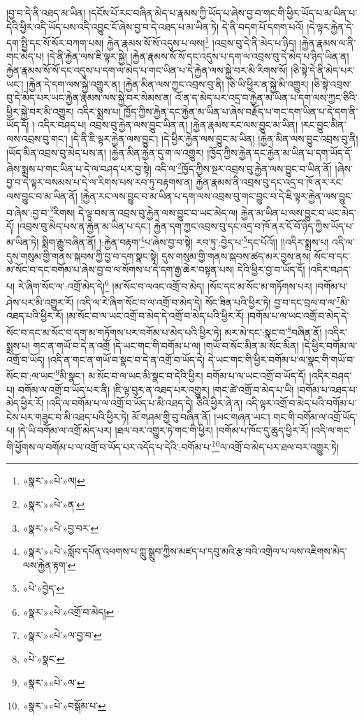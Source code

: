 །བྱ་བ་དེ་ནི་འཐད་མ་ཡིན། །དངོས་པོ་རང་བཞིན་མེད་པ་རྣམས་ཀྱི་ཡོད་པ་ཞེས་བྱ་བ་གང་གི་ཕྱིར་ཡོད་པ་མ་ཡིན་པ་དེའི་ཕྱིར་འདི་ཡོད་པས་འདི་འབྱུང་ངོ་ཞེས་བྱ་བ་དེ་འཐད་པ་མ་ཡིན་ཏེ། དེ་ནི་བདག་པོ་དགག་པའོ། །དེ་ལྟར་རྐྱེན་དེ་དག་སྤྱི་དང་སོ་སོར་བཀག་པས། རྐྱེན་རྣམས་སོ་སོ་འདུས་པ་ལས།\footnote{«སྣར་»«པེ་»ལ།} །འབྲས་བུ་དེ་ནི་མེད་པ་ཉིད། །རྐྱེན་རྣམས་ལ་ནི་གང་མེད་པ། །དེ་ནི་རྐྱེན་ལས་ཇི་ལྟར་སྐྱེ། །རྐྱེན་རྣམས་སོ་སོ་དང་འདུས་པ་དག་ལ་འབྲས་བུ་དེ་མེད་པ་ཉིད་ཡིན་ན། རྐྱེན་རྣམས་སོ་སོ་དང་འདུས་པ་དག་ལ་མེད་པ་གང་ཡིན་པ་དེ་རྐྱེན་ལས་སྐྱེ་བར་མི་རིགས་སོ། །ཅི་སྟེ་དེ་ནི་མེད་པར་ཡང་། །རྐྱེན་དེ་དག་ལས་སྐྱེ་འགྱུར་ན། །རྐྱེན་མིན་ལས་ཀྱང་འབྲས་བུ་ནི། །ཅི་ཡི་ཕྱིར་ན་སྐྱེ་མི་འགྱུར། །ཅི་སྟེ་འབྲས་བུ་དེ་མེད་པར་ཡང་རྐྱེན་རྣམས་ལས་སྐྱེ་བར་སེམས་ན། འོ་ན་ད་མེད་པར་འདྲ་བ་རྐྱེན་མ་ཡིན་པ་དག་ལས་ཀྱང་ཅིའི་ཕྱིར་སྐྱེ་བར་མི་འགྱུར། འདིར་སྨྲས་པ། ཁྱོད་ཀྱིས་རྐྱེན་དང་རྐྱེན་མ་ཡིན་པ་ཞེས་བརྗོད་པ་གང་དག་ཡིན་པ་དེ་དག་ནི་ཡོད་དོ། །
འདིར་བཤད་པ། འབྲས་བུ་རྐྱེན་ལས་བྱུང་ཡིན་ན། །རྐྱེན་རྣམས་རང་ལས་བྱུང་མ་ཡིན། །རང་བྱུང་མིན་ལས་འབྲས་བུ་གང་། །དེ་ནི་ཇི་ལྟར་རྐྱེན་ལས་བྱུང་། །དེ་ཕྱིར་རྐྱེན་ལས་བྱུང་མ་ཡིན། །རྐྱེན་མིན་ལས་བྱུང་འབྲས་བུ་ནི། །ཡོད་མིན་འབྲས་བུ་མེད་པས་ན། །རྐྱེན་མིན་རྐྱེན་དུ་ག་ལ་འགྱུར། །ཁྱོད་ཀྱིས་རྐྱེན་དང་རྐྱེན་མ་ཡིན་པ་དག་ཡོད་དོ་ཞེས་སྨྲས་པ་གང་ཡིན་པ་དེ་ལ་བཤད་པར་བྱ་སྟེ། འདི་ལ་\footnote{«སྣར་»«པེ་»ན་}ཁྱོད་ཀྱིས་སྔར་འབྲས་བུ་རྐྱེན་ལས་བྱུང་བ་ཡིན་ནོ། །ཞེས་བྱ་བ་དེ་ལྟར་བསམས་པ་དེ་ལ་རིགས་པས་རབ་ཏུ་བརྟགས་ན། རྐྱེན་རྣམས་ནི་འབྲས་བུ་དང་འདྲ་བ་ཁོ་ནར་རང་ལས་བྱུང་བ་མ་ཡིན་ནོ། །རྐྱེན་རང་ལས་བྱུང་བ་མ་ཡིན་པ་དག་ལས་འབྲས་བུ་གང་བྱུང་བ་དེ་ཇི་ལྟར་རྐྱེན་ལས་བྱུང་བ་ཞེས་:བྱ་བ་\footnote{«སྣར་»«པེ་»བྱ་བར་}རིགས། དེ་ལྟ་བས་ན་འབྲས་བུ་རྐྱེན་ལས་བྱུང་བ་ཡང་མེད་ལ། རྐྱེན་མ་ཡིན་པ་ལས་བྱུང་བ་ཡང་མེད་དོ། །འབྲས་བུ་མེད་པས་ན་རྐྱེན་མ་ཡིན་པ་དང་། རྐྱེན་དག་ཀྱང་འབྲས་བུ་དང་འདྲ་བ་ཁོ་ནར་ངོ་བོ་ཉིད་ཀྱིས་ཡོད་པ་མ་ཡིན་ཏེ། སྨིག་རྒྱུ་བཞིན་ནོ། །:རྐྱེན་བརྟག་\footnote{«སྣར་»«པེ་»སློབ་དཔོན་འཕགས་པ་ཀླུ་སྒྲུབ་ཀྱིས་མཛད་པ་དབུ་མའི་རྩ་བའི་འགྲེལ་པ་ལས་འཇིགས་མེད་ལས་རྐྱེན་རྟག་}པ་ཞེས་བྱ་བ་སྟེ། རབ་ཏུ་:བྱེད་པ་\footnote{«པེ་»བྱེད་}དང་པོའོ།། །།འདིར་སྨྲས་པ། འདི་ལ་དུས་གསུམ་གྱི་གནས་སྐབས་ཀྱི་བྱ་བ་དག་སྣང་སྟེ། དུས་གསུམ་གྱི་གནས་སྐབས་ཚད་མར་བྱས་ནས། སོང་བ་དང་མ་སོང་བ་དང་བགོམ་པ་ཞེས་བྱ་བ་ལ་སོགས་པ་དེ་དག་རྒྱ་ཆེར་བསྟན་པས། དེའི་ཕྱིར་བྱ་བ་ཡོད་དོ། །འདིར་བཤད་པ། རེ་ཞིག་སོང་ལ་:འགྲོ་མེད་དེ།\footnote{«སྣར་»«པེ་»འགྲོ་བ་མེད།} །མ་སོང་བ་ལའང་འགྲོ་བ་མེད། །སོང་དང་མ་སོང་མ་གཏོགས་པར། །བགོམ་པ་ཤེས་པར་མི་འགྱུར་རོ། །འདི་ལ་རེ་ཞིག་སོང་བ་ལ་འགྲོ་བ་མེད་དེ། སོང་ཟིན་པའི་ཕྱིར་ཏེ། བྱ་བ་དང་བྲལ་བ་ལ་\footnote{«སྣར་»«པེ་»ལ་བྱ་བ་}མི་འཐད་པའི་ཕྱིར་རོ། །མ་སོང་བ་ལ་ཡང་འགྲོ་བ་མེད་དེ་འགྲོ་བ་མེད་པའི་ཕྱིར་རོ། །བགོམ་པ་ལ་ཡང་འགྲོ་བ་མེད་དེ་སོང་བ་དང་མ་སོང་བ་དག་མ་གཏོགས་པར་བགོམ་པ་མེད་པའི་ཕྱིར་ཏེ། མར་མེ་དང་:སྣང་བ་\footnote{«པེ་»སྣང་}བཞིན་ནོ། །འདིར་སྨྲས་པ། གང་ན་གཡོ་བ་དེ་ན་འགྲོ །དེ་ཡང་གང་གི་བགོམ་པ་ལ། །གཡོ་བ་སོང་མིན་མ་སོང་མིན། །དེ་ཕྱིར་བགོམ་ལ་འགྲོ་བ་ཡོད། །འདི་ན་གང་ན་གཡོ་བ་སྣང་བ་དེ་ན་འགྲོ་བ་ཡོད་དེ། དེ་ཡང་གང་གི་ཕྱིར་བགོམ་པ་ལ་སྣང་གི་གཡོ་བ་སོང་བ་:ལ་ཡང་\footnote{«སྣར་»«པེ་»ལ་}མི་སྣང་། མ་སོང་བ་ལ་ཡང་མི་སྣང་བ་དེའི་ཕྱིར། བགོམ་པ་ལ་ཡང་འགྲོ་བ་ཡོད་དོ། །འདིར་བཤད་པ། བགོམ་ལ་འགྲོ་བ་ཡོད་པར་ནི། །ཇི་ལྟ་བུར་ན་འཐད་པར་འགྱུར། །གང་ཚེ་འགྲོ་བ་མེད་པ་ཡི། །བགོམ་པ་འཐད་པ་མེད་ཕྱིར་རོ། །འདི་ལ་བགོམ་པ་ལ་འགྲོ་བ་ཡོད་པ་མི་འཐད་དེ། ཅིའི་ཕྱིར་ཞེ་ན། འདི་ལྟར་འགྲོ་བ་མེད་པའི་བགོམ་པ་ངེས་པར་གཟུང་བ་མི་འཐད་པའི་ཕྱིར་ཏེ། མོ་གཤམ་གྱི་བུ་བཞིན་ནོ། །ཡང་གཞན་ཡང་། གང་གི་བགོམ་ལ་འགྲོ་ཡོད་པ། །དེ་ཡི་བགོམ་ལ་འགྲོ་མེད་པར། །ཐལ་བར་འགྱུར་ཏེ་གང་གི་ཕྱིར། །བགོམ་པ་ཁོང་དུ་ཆུད་ཕྱིར་རོ། །འདི་ལ་གང་གི་ཕྱོགས་ལ་བགོམ་པ་ལ་འགྲོ་བ་ཡོད་པར་འདོད་པ་དེའི་:བགོམ་པ་\footnote{«སྣར་»«པེ་»བསྒོམ་པ་}ལ་འགྲོ་བ་མེད་པར་ཐལ་བར་འགྱུར་ཏེ། 